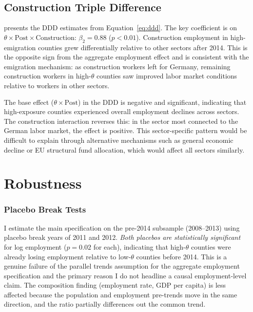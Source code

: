 \documentclass[12pt]{article}
\begin{document}
\subsection{Construction Triple Difference}

 presents the DDD estimates from Equation~\eqref{eq:ddd}. The key coefficient is on $\theta \times \text{Post} \times \text{Construction}$: $\beta_2 = 0.88$ ($p < 0.01$). Construction employment in high-emigration counties grew differentially relative to other sectors after 2014. This is the opposite sign from the aggregate employment effect and is consistent with the emigration mechanism: as construction workers left for Germany, remaining construction workers in high-$\theta$ counties saw improved labor market conditions relative to workers in other sectors.



The base effect ($\theta \times \text{Post}$) in the DDD is negative and significant, indicating that high-exposure counties experienced overall employment declines across sectors. The construction interaction reverses this: in the sector most connected to the German labor market, the effect is positive. This sector-specific pattern would be difficult to explain through alternative mechanisms such as general economic decline or EU structural fund allocation, which would affect all sectors similarly.


\section{Robustness}
\label{sec:robustness}

\subsubsection*{Placebo Break Tests} I estimate the main specification on the pre-2014 subsample (2008--2013) using placebo break years of 2011 and 2012. \textit{Both placebos are statistically significant} for log employment ($p = 0.02$ for each), indicating that high-$\theta$ counties were already losing employment relative to low-$\theta$ counties before 2014. This is a genuine failure of the parallel trends assumption for the aggregate employment specification and the primary reason I do not headline a causal employment-level claim. The composition finding (employment rate, GDP per capita) is less affected because the population and employment pre-trends move in the same direction, and the ratio partially differences out the common trend.
\end{document}
